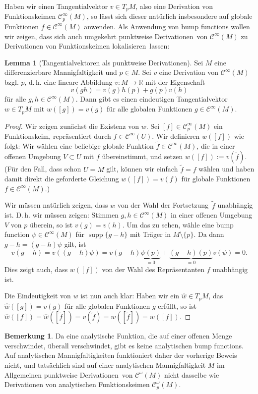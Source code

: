 \documentclass[a4paper]{scrreprt}
\numberwithin{equation}{chapter}
\DeclareMathOperator{\supp}{supp}
\newcommand{\R}{\mathbb{R}}
\newcommand{\sC}{\mathcal{C}^{\infty}}
\theoremstyle{definition}
\newtheorem{lemma}[defn]{Lemma}
\newtheorem{bem}[defn]{Bemerkung}
\begin{document}
Haben wir einen Tangentialvektor $v \in T_pM$, also eine Derivation von Funktionskeimen $\sC_p(M)$, so lässt sich dieser natürlich insbesondere auf globale Funktionen $f \in \sC(M)$ anwenden. Als Anwendung von bump functions wollen wir zeigen, dass sich auch umgekehrt \glqq punktweise Derivationen\grqq\ von $\sC(M)$ zu Derivationen von Funktionskeimen \glqq lokalisieren\grqq\ lassen:
\begin{lemma}[Tangentialvektoren als punktweise Derivationen] \label{lemma:tangtvek_punktw_deriv}
	Sei $M$ eine differenzierbare Mannigfaltigkeit und $p\in M$. Sei $v$ eine Derivation von $\sC(M)$ bzgl. $p$, d.\,h. eine lineare Abbildung $v\colon M \to \R$ mit der Eigenschaft \[v(gh) = v(g) h(p) + g(p) v(h)\] für alle $g,h \in \sC(M)$. Dann gibt es einen eindeutigen Tangentialvektor $w \in T_pM$ mit $w([g]) = v(g)$ für alle globalen Funktionen $g \in \sC(M)$.

	\begin{proof}
		Wir zeigen zunächst die Existenz von $w$. Sei $[f] \in \sC_p(M)$ ein Funktionskeim, repräsentiert durch $f\in \sC(U)$. Wir definieren $w([f])$ wie folgt: Wir wählen eine beliebige globale Funktion $\tilde f \in \sC(M)$, die in einer offenen Umgebung $V \subset U$ mit $f$ übereinstimmt, und setzen $w([f]) := v(\tilde f)$. (Für den Fall, dass schon $U=M$ gilt, können wir einfach $\tilde f = f$ wählen und haben damit direkt die geforderte Gleichung $w([f]) = v(f)$ für globale Funktionen $f \in \sC(M)$.)

		Wir müssen natürlich zeigen, dass $w$ von der Wahl der \glqq Fortsetzung\grqq\ $\tilde f$ unabhängig ist. D.\,h. wir müssen zeigen: Stimmen $g,h \in \sC(M)$ in einer offenen Umgebung $V$ von $p$ überein, so ist $v(g) = v(h)$. Um das zu sehen, wähle eine bump function $\psi \in \sC(M)$ für $\supp\{g - h\}$ mit Träger in $M\setminus \{p\}$. Da dann $g-h = (g-h)\psi$ gilt, ist \[v(g-h) = v((g-h)\psi) = v(g-h) \underbrace{\psi(p)}_{=0} + \underbrace{(g-h)(p)}_{=0} v(\psi) = 0.\]
		Dies zeigt auch, dass $w([f])$ von der Wahl des Repräsentanten $f$ unabhängig ist.

		Die Eindeutigkeit von $w$ ist nun auch klar: Haben wir ein $\hat w \in T_pM$, das $\hat w([g]) = v(g)$ für alle globalen Funktionen $g$ erfüllt, so ist $\hat w([f]) = \hat w([\tilde f]) = v(\tilde f) = w([\tilde f]) = w([f])$.
	\end{proof}
\end{lemma}

\begin{bem}
	Da eine analytische Funktion, die auf einer offenen Menge verschwindet, überall verschwindet, gibt es keine analytischen bump functions. Auf analytischen Mannigfaltigkeiten funktioniert daher der vorherige Beweis nicht, und tatsächlich sind auf einer analytischen Mannigfaltigkeit $M$ im Allgemeinen \glqq punktweise Derivationen\grqq\ von $\mathcal C^\omega(M)$ nicht dasselbe wie Derivationen von analytischen Funktionskeimen $\mathcal C^\omega_p(M)$.
\end{bem}
\end{document}
